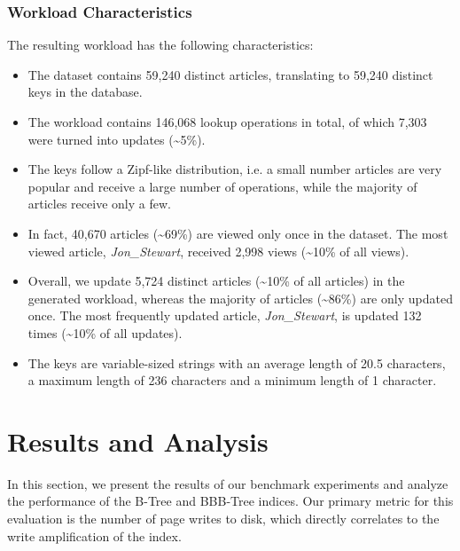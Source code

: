 \subsubsection*{Workload Characteristics}
\label{sec:workload-characteristics}
The resulting workload has the following characteristics:
\begin{itemize}
    \item The dataset contains 59,240 distinct articles, translating to 59,240 distinct keys in the database.
    \item The workload contains 146,068 lookup operations in total, of which 7,303 were turned into updates (\textasciitilde5\%).
    \item The keys follow a Zipf-like distribution, i.e. a small number articles are very popular and receive a large number of operations, while the majority of articles receive only a few. 
    \item In fact, 40,670 articles (\textasciitilde69\%) are viewed only once in the dataset. 
    The most viewed article, \textit{Jon\_Stewart}, received 2,998 views (\textasciitilde10\% of all views).
    \item Overall, we update 5,724 distinct articles (\textasciitilde10\% of all articles) in the generated workload, whereas the majority of articles (\textasciitilde86\%) are only updated once.
    The most frequently updated article, \textit{Jon\_Stewart}, is updated 132 times (\textasciitilde10\% of all updates).
    \item The keys are variable-sized strings with an average length of 20.5 characters, a maximum length of 236 characters and a minimum length of 1 character.
\end{itemize}


\section{Results and Analysis}
In this section, we present the results of our benchmark experiments and analyze the performance of the B-Tree and BBB-Tree indices.
Our primary metric for this evaluation is the number of page writes to disk, which directly correlates to the write amplification of the index.



